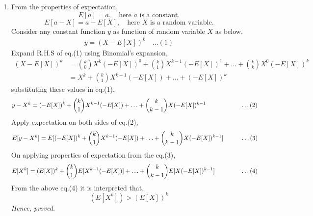\documentclass{article}
\begin{document}
\begin{enumerate}
\newpage
\item 
    From the properties of expectation,    
    \[
        E[a] = a, \quad \text{here } a \text{ is a constant.}
    \]
    \[
        E[a - X] = a - E[X], \quad \text{here } X \text{ is a random variable.}
    \]
    Consider any constant function \( y \) as function of random variable \( X \) as below.
    \begin{align*}
        y = (X - E[X])^k \quad \ldots (1)
    \end{align*} 
    Expand R.H.S of eq.(1) using Binomial's expansion,
    \begin{align*}
        (X - E[X])^k 
        &= \binom{k}{0}X^k(-E[X])^0 + \binom{k}{1}X^{k-1}(-E[X])^1 + \ldots + \binom{k}{k}X^0(-E[X])^k \\
        &= X^k + \binom{k}{1}X^{k-1}(-E[X]) + \ldots + (-E[X])^k
    \end{align*}
    substituting these values in eq.(1),
    \begin{equation*}
        y - X^k = (-E[X])^k + \binom{k}{1}X^{k-1}(-E[X]) + \ldots + \binom{k}{k-1}X(-E[X])^{k-1} \hspace{20mm}\ldots (2)
    \end{equation*} 
    Apply expectation on both sides of eq.(2),
    \begin{equation*}
        E[y - X^k] = E[(-E[X])^k + \binom{k}{1}X^{k-1}(-E[X]) + \ldots + \binom{k}{k-1}X(-E[X])^{k-1}] \hspace{10mm}\ldots (3)
    \end{equation*}  
    On applying properties of expectation from the eq.(3), 
    \begin{equation*}
        E[X^k] = (E[X])^k + \binom{k}{1}E[X^{k-1}(-E[X])] + \ldots + \binom{k}{k-1}E[X(-E[X])^{k-1}] \hspace{15mm}\ldots (4)
    \end{equation*}
    From the above eq.(4) it is interpreted that,
    \begin{equation*}
        (E[X^k]) > (E[X])^k
    \end{equation*}
    \textit{Hence, proved.}


\end{enumerate}
\end{document}
